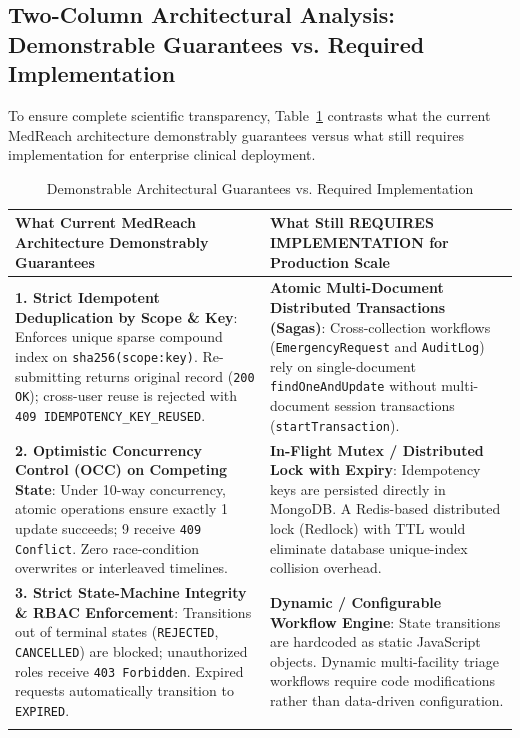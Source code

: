 \documentclass[conference]{IEEEtran}
\begin{document}
\subsection{Two-Column Architectural Analysis: Demonstrable Guarantees vs. Required Implementation}
To ensure complete scientific transparency, Table~\ref{tab:guarantees} contrasts what the current MedReach architecture demonstrably guarantees versus what still requires implementation for enterprise clinical deployment.

\begin{table}[t]
\centering
\caption{Demonstrable Architectural Guarantees vs. Required Implementation}
\label{tab:guarantees}
\begin{tabularx}{\textwidth}{X X}
\toprule
\textbf{What Current MedReach Architecture Demonstrably Guarantees} & \textbf{What Still REQUIRES IMPLEMENTATION for Production Scale} \\
\midrule
\textbf{1. Strict Idempotent Deduplication by Scope \& Key}: Enforces unique sparse compound index on \texttt{sha256(scope:key)}. Re-submitting returns original record (\texttt{200 OK}); cross-user reuse is rejected with \texttt{409 IDEMPOTENCY\_KEY\_REUSED}. & \textbf{Atomic Multi-Document Distributed Transactions (Sagas)}: Cross-collection workflows (\texttt{EmergencyRequest} and \texttt{AuditLog}) rely on single-document \texttt{findOneAndUpdate} without multi-document session transactions (\texttt{startTransaction}). \\
\addlinespace
\textbf{2. Optimistic Concurrency Control (OCC) on Competing State}: Under 10-way concurrency, atomic operations ensure exactly 1 update succeeds; 9 receive \texttt{409 Conflict}. Zero race-condition overwrites or interleaved timelines. & \textbf{In-Flight Mutex / Distributed Lock with Expiry}: Idempotency keys are persisted directly in MongoDB. A Redis-based distributed lock (Redlock) with TTL would eliminate database unique-index collision overhead. \\
\addlinespace
\textbf{3. Strict State-Machine Integrity \& RBAC Enforcement}: Transitions out of terminal states (\texttt{REJECTED}, \texttt{CANCELLED}) are blocked; unauthorized roles receive \texttt{403 Forbidden}. Expired requests automatically transition to \texttt{EXPIRED}. & \textbf{Dynamic / Configurable Workflow Engine}: State transitions are hardcoded as static JavaScript objects. Dynamic multi-facility triage workflows require code modifications rather than data-driven configuration. \\
\addlinespace

\end{tabularx}
\end{table}
\end{document}
